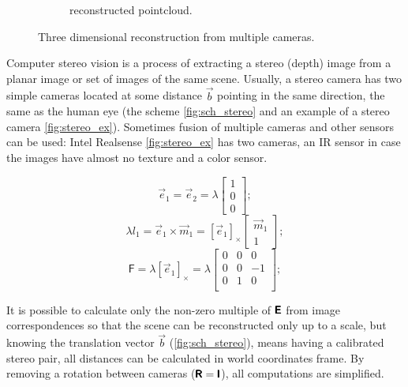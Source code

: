 \begin{figure}[h]
\begin{subfigure}[b]{0.65\textwidth}
      \caption{reconstructed pointcloud.}
      \label{fig:pc_output}
    \end{subfigure}
    \caption{Three dimensional reconstruction from multiple cameras.}
    \label{fig:pc_recons}
\end{figure}

Computer stereo vision is a process of extracting a stereo (depth) image from a planar image or set of images of the same scene. Usually, a stereo camera has two simple cameras located at some distance $\vec{b}$ pointing in the same direction, the same as the human eye (the scheme \autoref{fig:sch_stereo} and an example of a stereo camera \autoref{fig:stereo_ex}). 
Sometimes fusion of multiple cameras and other sensors can be used:
Intel Realsense \autoref{fig:stereo_ex} has two cameras, an IR sensor in case the images have almost no texture and a color sensor. 

\begin{equation}
    \label{eq:e1e2}
    \vec{e}_1 = \vec{e}_2 = \lambda \begin{bmatrix} 1 \\ 0 \\ 0 \end{bmatrix};
\end{equation}
\begin{equation}
    \label{eq:e1m1}
    \lambda l_1 = \vec{e}_1 \times \vec{m}_1 = [\vec{e}_1]_\times \begin{bmatrix} \vec{m}_1 \\ 1\end{bmatrix};
\end{equation}
\begin{equation}
    \label{eq:F_simple}
    \pmb{\mathsf{F}} = \lambda [\vec{e}_1]_\times = \lambda \begin{bmatrix}
        0 & 0 & 0 \\
        0 & 0 & -1 \\
        0 & 1 & 0 \\
    \end{bmatrix};
\end{equation}

It is possible to calculate only the non-zero multiple of $\pmb{\mathsf{E}}$ from image correspondences so that the scene can be reconstructed only up to a scale, but knowing the translation vector $\vec{b}$ (\autoref{fig:sch_stereo}), means having a calibrated stereo pair, all distances can be calculated in world coordinates frame.
By removing a rotation between cameras ($\pmb{\mathsf{R}} = \pmb{\mathsf{I}}$), all computations are simplified.


